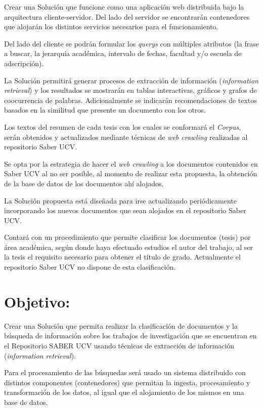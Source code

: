 \documentclass[
  10,
  spanish,
  openany]{book}
\begin{document}
Crear una Solución que funcione como una aplicación web distribuida bajo la arquitectura cliente-servidor. Del lado del servidor se encontrarán contenedores que alojarán los distintos servicios necesarios para el funcionamiento.

Del lado del cliente se podrán formular los \emph{querys} con múltiples atributos (la frase a buscar, la jerarquía académica, intervalo de fechas, facultad y/o escuela de adscripción).

La Solución permitirá generar procesos de extracción de información (\emph{information retrieval}) y los resultados se mostrarán en tablas interactivas, gráficos y grafos de coocurrencia de palabras. Adicionalmente se indicarán recomendaciones de textos basados en la similitud que presente un documento con los otros.

Los textos del resumen de cada tesis con los cuales se conformará el \emph{Corpus}, serán obtenidos y actualizados mediante técnicas de \emph{web crawling} realizadas al repositorio Saber UCV.

Se opta por la estrategia de hacer el \emph{web crawling} a los documentos contenidos en Saber UCV al no ser posible, al momento de realizar esta propuesta, la obtención de la base de datos de los documentos ahí alojados.

La Solución propuesta está diseñada para irse actualizando periódicamente incorporando los nuevos documentos que sean alojados en el repositorio Saber UCV.

Contará con un procedimiento que permite clasificar los documentos (tesis) por área académica, según donde haya efectuado estudios el autor del trabajo, al ser la tesis el requisito necesario para obtener el título de grado. Actualmente el repositorio Saber UCV no dispone de esta clasificación.

\hypertarget{objetivogral}{%
\section{Objetivo:}\label{objetivogral}}

Crear una Solución que permita realizar la clasificación de documentos y la búsqueda de información sobre los trabajos de investigación que se encuentran en el Repositorio SABER UCV usando técnicas de extracción de información (\emph{information retrieval}).

Para el procesamiento de las búsquedas será usado un sistema distribuido con distintos componentes (contenedores) que permitan la ingesta, procesamiento y transformación de los datos, al igual que el alojamiento de los mismos en una base de datos.
\end{document}

